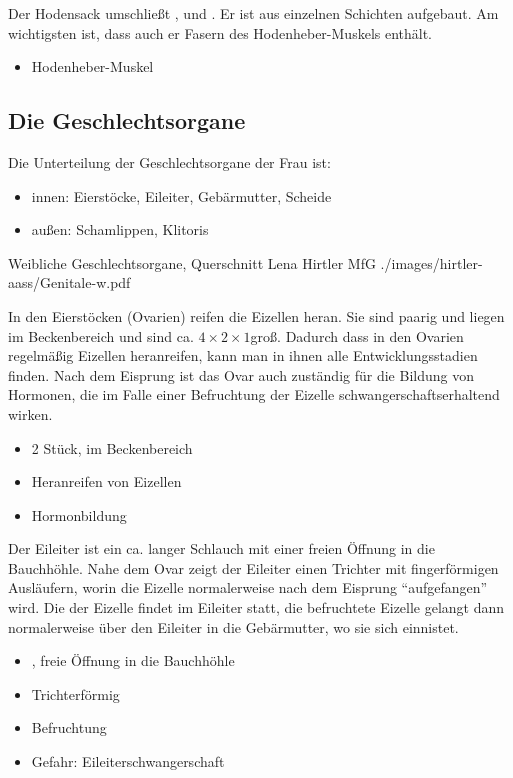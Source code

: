 {%
Der Hodensack umschließt ,  und
. Er ist aus einzelnen Schichten aufgebaut.
Am wichtigsten ist, dass auch er Fasern des
Hodenheber-Muskels enthält.
}{%
\begin{itemize}
  \item Hodenheber-Muskel
\end{itemize}
}{}{}{}

\subsection{Die  Geschlechtsorgane}

Die Unterteilung der Geschlechtsorgane der Frau ist:
\begin{itemize}
  \item innen: Eierstöcke, Eileiter, Gebärmutter, Scheide
  \item außen: Schamlippen, Klitoris
\end{itemize}

\Picture
{Weibliche Geschlechtsorgane,
Querschnitt}%
{}%
{}%
{Lena Hirtler}%
{MfG}%
{./images/hirtler-aass/Genitale-w.pdf}%
{}%
{}%


{%
In den Eierstöcken (Ovarien) reifen die Eizellen heran. Sie
sind paarig und liegen im Beckenbereich und sind ca. $4
\times 2 \times 1$\CM* groß. Dadurch dass in den Ovarien
regelmäßig Eizellen heranreifen, kann man in ihnen alle
Entwicklungsstadien finden. Nach dem Eisprung ist das Ovar
auch zuständig für die Bildung von Hormonen, die im Falle
einer Befruchtung der Eizelle schwangerschaftserhaltend
wirken.
}
{
\begin{itemize}
  \item 2 Stück, im Beckenbereich
  \item Heranreifen von Eizellen
  \item Hormonbildung
\end{itemize}
}{}{}{}


{%
Der Eileiter  ist ein ca.
\CM* langer Schlauch mit einer freien Öffnung
in die Bauchhöhle. Nahe dem Ovar zeigt der Eileiter einen
Trichter mit fingerförmigen Ausläufern, worin die Eizelle
normalerweise nach dem Eisprung
\protect\enquote{aufgefangen} wird.
Die  der Eizelle findet im Eileiter statt,
die befruchtete Eizelle gelangt dann normalerweise über den
Eileiter in die Gebärmutter, wo sie sich einnistet.
}
{
\begin{itemize}
  \item {}\CM*, freie Öffnung in die Bauchhöhle
  \item Trichterförmig
  \item Befruchtung
  \item Gefahr: Eileiterschwangerschaft
\end{itemize}
}{}{}{}



